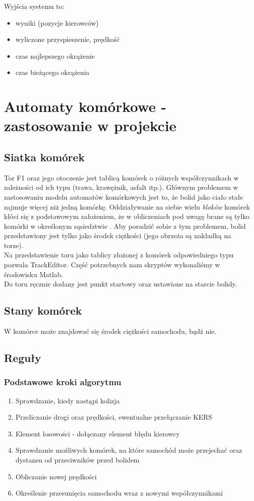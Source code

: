 \documentclass{article}
\begin{document}
Wyjścia systemu to:
\begin{itemize}
\item wyniki (pozycje kierowców)
\item wyliczone przyspieszenie, prędkość
\item czas najlepszego okrążenie
\item czas bieżącego okrążenia
\end{itemize}


\section{Automaty komórkowe - zastosowanie w projekcie}
\subsection{Siatka komórek}
Tor F1 oraz jego otoczenie jest tablicą komórek o różnych współczynnikach w zależności od ich typu (trawa, krawężnik, asfalt itp.). Głównym problemem w zastosowaniu modelu automatów komórkowych jest to, że bolid jako ciało stałe zajmuje więcej niż jedną komórkę. Oddziaływanie na siebie wielu \textit{bloków} komórek kłóci się z podstawowym założeniem, że w obliczeniach pod uwagę brane są tylko komórki w określonym sąsiedztwie \cite{particleSimulation}. Aby poradzić sobie z tym problemem, bolid przedstawiony jest tylko jako środek ciężkości (jego obrzeża są nakładką na torze). 	\\

Na przedstawienie toru jako tablicy złożonej z komórek odpowiedniego typu pozwala TrackEditor. Część potrzebnych nam skryptów wykonaliśmy w środowisku Matlab. \\

Do toru ręcznie dodany jest punkt startowy oraz ustawione na starcie bolidy.

\subsection{Stany komórek}
W komórce może znajdować się środek ciężkości samochodu, bądź nie.

\subsection{Reguły}
\subsubsection{Podstawowe kroki algorytmu}
\begin{enumerate}
\item Sprawdzanie, kiedy nastąpi kolizja
\item Przeliczanie drogi oraz prędkości, ewentualne przełączanie KERS
\item Element losowości - dołączany element błędu kierowcy
\item Sprawdzanie możliwych komórek, na które samochód może przejechać oraz dystansu od przeciwników przed bolidem
\item Obliczanie nowej prędkości
\item Określenie przesunięcia samochodu wraz z nowymi współczynnikami
\end{enumerate}
\end{document}
